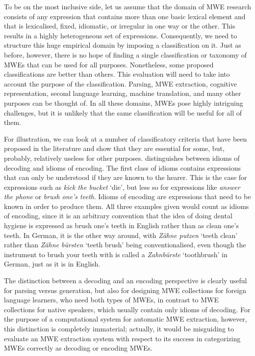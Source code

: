 \documentclass[output=paper]{langsci/langscibook}
\begin{document}
To be on the most inclusive side, let us assume that the domain of MWE research consists of any expression that contains more than one basic lexical element and that is lexicalised, fixed, idiomatic, or irregular in one way or the other. This results in a highly heterogeneous set of expressions. Consequently, we need to structure this huge empirical domain by imposing a classification on it. Just as before, however, there is no hope of finding a single classification or taxonomy of MWEs that can be used for all purposes. Nonetheless, some proposed classifications are better than others. This evaluation will need to take into account the purpose of the classification. Parsing, MWE extraction, cognitive representation, second language learning, machine translation, and many other purposes can be thought of. In all these domains, MWEs pose highly intriguing challenges, but it is unlikely that the same classification will be useful for all of them.

For illustration, we can look at a number of classificatory criteria that have been proposed in the literature and show that they are essential for some, but, probably, relatively useless for other purposes. \cite{Makai:72} distinguishes between idioms of decoding and idioms of encoding. The first class of idioms contains expressions that can only be understood if they are known to the hearer. This is the case for expressions such as \textit{kick the bucket} ‘die’, but less so for expressions like \textit{answer the phone} or \textit{brush one’s teeth}. Idioms of encoding are expressions that need to be known in order to produce them. All three examples given would count as idioms of encoding, since it is an arbitrary convention that the idea of doing dental hygiene is expressed as brush one’s teeth in English rather than as clean one’s teeth. In German, it is the other way around, with \textit{Z\"ahne putzen} `teeth clean’ rather than \textit{Z\"ahne b\"ursten} `teeth brush’ being conventionalised, even though the instrument to brush your teeth with is called a \textit{Zahnb\"urste} `toothbrush' in German, just as it is in English.

The distinction between a decoding and an encoding perspective is clearly useful for parsing versus generation, but also for designing MWE collections for foreign language learners, who need both types of MWEs, in contrast to MWE collections for native speakers, which usually contain only idioms of decoding. For the purpose of a computational system for automatic MWE extraction, however, this distinction is completely immaterial; actually, it would be misguiding to evaluate an MWE extraction system with respect to its success in categorizing MWEs correctly as decoding or encoding MWEs.
\end{document}
